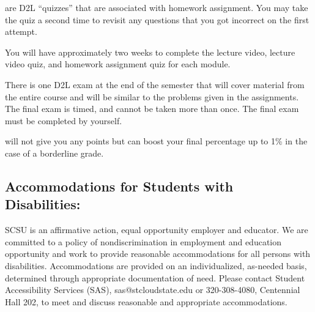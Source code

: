 \documentclass{tufte-handout}
\begin{document}
  are D2L ``quizzes'' that are associated with homework assignment. You may take the quiz a second time to revisit any questions that you got incorrect on the first attempt.


\color{blue}You will have approximately two weeks to complete the lecture video, lecture video quiz, and homework assignment quiz for each module. \color{black}

\begin{fullwidth}


 There is one D2L exam at the end of the semester that will cover material from the entire course and will be similar to the problems given in the assignments. The final exam is timed, and cannot be taken more than once. The final exam must be completed by yourself.



 will not give you any points but can boost your final percentage up to 1\% in the case of a borderline grade.






\subsection{Accommodations for Students with Disabilities: } 

SCSU is an affirmative action, equal opportunity employer and educator. We are committed to a policy of nondiscrimination in employment and education opportunity and work to provide reasonable accommodations for all persons with disabilities. Accommodations are provided on an individualized, as-needed basis, determined through appropriate documentation of need. Please contact Student Accessibility Services (SAS), sas@stcloudstate.edu or 320-308-4080, Centennial Hall 202, to meet and discuss reasonable and appropriate accommodations. 





\end{fullwidth}
\end{document}
